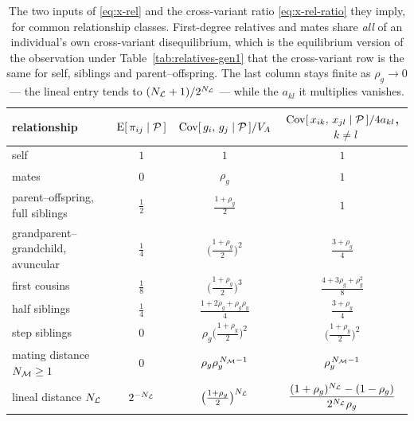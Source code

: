\documentclass[12pt]{article}
\begin{document}
\begin{table}[H]
    \begin{floatcard}
    \renewcommand{\arraystretch}{2.0}
    \setlength{\tabcolsep}{3pt}
    \scriptsize
    \begin{tabular}{l|c|c|c}
        relationship
            & $\mathrm{E}[\,\pi_{ij} \mid \mathcal{P}\,]$
            & $\mathrm{Cov}[\,g_i,\, g_j \mid \mathcal{P}\,]/V_A$
            & $\mathrm{Cov}[\,x_{ik},\, x_{jl} \mid \mathcal{P}\,]/4a_{kl}$, \ $k \neq l$ \\
        \hline
        self & $1$ & $1$ & $1$ \\
        mates & $0$ & $\rho_g$ & $1$ \\
        parent--offspring, full siblings & $\tfrac12$ & $\tfrac{1+\rho_g}{2}$ & $1$ \\
        grandparent--grandchild, avuncular & $\tfrac14$ & $\big(\tfrac{1+\rho_g}{2}\big)^2$ & $\tfrac{3+\rho_g}{4}$ \\
        first cousins & $\tfrac18$ & $\big(\tfrac{1+\rho_g}{2}\big)^3$ & $\tfrac{4+3\rho_g+\rho_g^2}{8}$ \\
        half siblings & $\tfrac14$ & $\tfrac{1+2\rho_g+\rho_g\rho_y}{4}$ & $\tfrac{3+\rho_y}{4}$ \\
        step siblings & $0$ & $\rho_g\big(\tfrac{1+\rho_y}{2}\big)^2$ & $\big(\tfrac{1+\rho_y}{2}\big)^2$ \\
        mating distance $N_{\mathcal{M}} \geq 1$ & $0$ & $\rho_g\rho_y^{\,N_{\mathcal{M}}-1}$ & $\rho_y^{\,N_{\mathcal{M}}-1}$ \\
        lineal distance $N_{\mathcal{L}}$ & $2^{-N_{\mathcal{L}}}$ & $\big(\tfrac{1+\rho_g}{2}\big)^{N_{\mathcal{L}}}$ & $\dfrac{(1+\rho_g)^{N_{\mathcal{L}}} - (1-\rho_g)}{2^{N_{\mathcal{L}}}\rho_g}$ \\
    \end{tabular}
    \caption{%
        The two inputs of \eqref{eq:x-rel} and the cross-variant ratio \eqref{eq:x-rel-ratio} they imply, for common relationship classes.
        First-degree relatives and mates share \emph{all} of an individual's own cross-variant disequilibrium, which is the equilibrium version of the observation under Table~\ref{tab:relatives-gen1} that the cross-variant row is the same for self, siblings and parent--offspring.
        The last column stays finite as $\rho_g \to 0$ --- the lineal entry tends to $(N_{\mathcal{L}} + 1)/2^{N_{\mathcal{L}}}$ --- while the $a_{kl}$ it multiplies vanishes.%
    }
    \label{tab:x-rel-classes}
    \end{floatcard}
\end{table}
\end{document}
